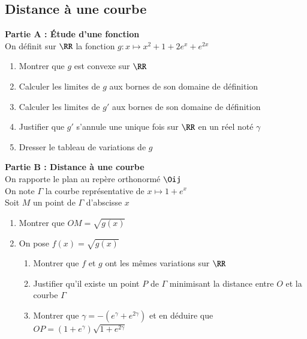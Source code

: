 \documentclass[oneside,12pt]{article}          %
\begin{document}
\subsection{Distance à une courbe}
\textbf{Partie A : Étude d'une fonction}\\
On définit sur $\RR$ la fonction $g:x\mapsto x^2+1+2e^x+e^{2x}$
\begin{enumerate}
    \item Montrer que $g$ est convexe sur $\RR$
    \item Calculer les limites de $g$ aux bornes de son domaine de définition
    \item Calculer les limites de $g'$ aux bornes de son domaine de définition
    \item Justifier que $g'$ s'annule une unique fois sur $\RR$ en un réel noté $\gamma$
    \item Dresser le tableau de variations de $g$
\end{enumerate}

\textbf{Partie B : Distance à une courbe}\\
On rapporte le plan au repère orthonormé $\Oij$\\
On note $\Gamma$ la courbe représentative de $x\mapsto1+e^x$\\
Soit $M$ un point de $\Gamma$ d'abscisse $x$
\begin{enumerate}
    \item Montrer que $OM=\sqrt{g(x)}$
    \item On pose $f(x)=\sqrt{g(x)}$
    \begin{enumerate}
        \item Montrer que $f$ et $g$ ont les mêmes variations sur $\RR$
        \item Justifier qu'il existe un point $P$ de $\Gamma$ minimisant la distance entre $O$ et la courbe $\Gamma$
        \item  Montrer que $\gamma=-(e^\gamma+e^{2\gamma})$ et en déduire que $OP=(1+e^\gamma)\sqrt{1+e^{2\gamma}}$
    \end{enumerate}
\end{enumerate}
\end{document}
